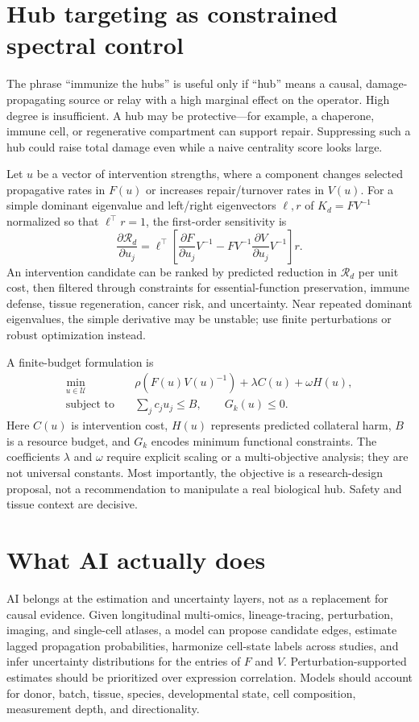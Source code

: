 \documentclass[11pt,a4paper]{article}
\newcommand{\Rd}{\mathcal{R}_{d}}
\newcommand{\rhoop}{\rho}
\begin{document}
\section{Hub targeting as constrained spectral control}
The phrase “immunize the hubs” is useful only if “hub” means a causal, damage-propagating source or relay with a high marginal effect on the operator. High degree is insufficient. A hub may be protective—for example, a chaperone, immune cell, or regenerative compartment can support repair. Suppressing such a hub could raise total damage even while a naive centrality score looks large.

Let $u$ be a vector of intervention strengths, where a component changes selected propagative rates in $F(u)$ or increases repair/turnover rates in $V(u)$. For a simple dominant eigenvalue and left/right eigenvectors $\ell,r$ of $K_d=FV^{-1}$ normalized so that $\ell^\top r=1$, the first-order sensitivity is
\begin{equation}
\frac{\partial\Rd}{\partial u_j}=\ell^\top\left[\frac{\partial F}{\partial u_j}V^{-1}-FV^{-1}\frac{\partial V}{\partial u_j}V^{-1}\right]r.
\label{eq:sensitivity}
\end{equation}
An intervention candidate can be ranked by predicted reduction in $\Rd$ per unit cost, then filtered through constraints for essential-function preservation, immune defense, tissue regeneration, cancer risk, and uncertainty. Near repeated dominant eigenvalues, the simple derivative may be unstable; use finite perturbations or robust optimization instead.

A finite-budget formulation is
\begin{align}
\min_{u\in\mathcal U}\quad & \rhoop\!\left(F(u)V(u)^{-1}\right)+\lambda C(u)+\omega H(u),\\
\text{subject to}\quad & \sum_j c_j u_j\leq B,\qquad G_k(u)\leq 0.
\end{align}
Here $C(u)$ is intervention cost, $H(u)$ represents predicted collateral harm, $B$ is a resource budget, and $G_k$ encodes minimum functional constraints. The coefficients $\lambda$ and $\omega$ require explicit scaling or a multi-objective analysis; they are not universal constants. Most importantly, the objective is a research-design proposal, not a recommendation to manipulate a real biological hub. Safety and tissue context are decisive.

\section{What AI actually does}
AI belongs at the estimation and uncertainty layers, not as a replacement for causal evidence. Given longitudinal multi-omics, lineage-tracing, perturbation, imaging, and single-cell atlases, a model can propose candidate edges, estimate lagged propagation probabilities, harmonize cell-state labels across studies, and infer uncertainty distributions for the entries of $F$ and $V$. Perturbation-supported estimates should be prioritized over expression correlation. Models should account for donor, batch, tissue, species, developmental state, cell composition, measurement depth, and directionality.
\end{document}
